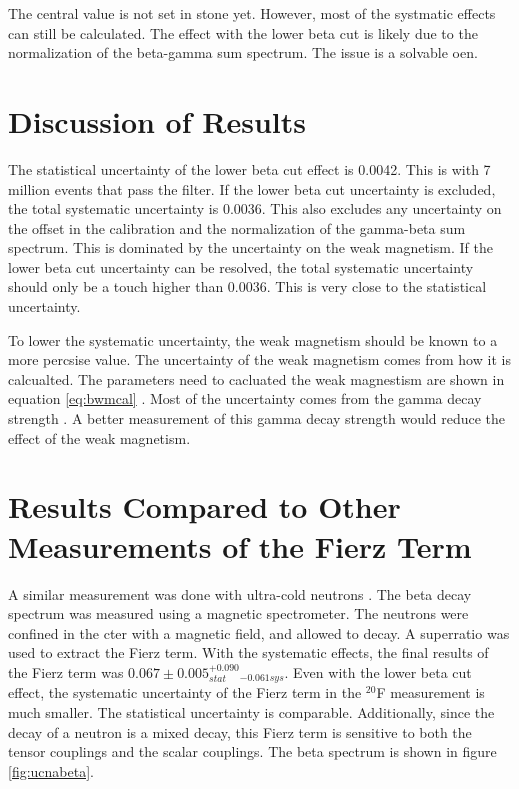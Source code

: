 \documentclass[main.tex]{subfiles}
\begin{document}
The central value is not set in stone yet.
However, most of the systmatic effects can still be calculated.
The effect with the lower beta cut is likely due to the normalization of the beta-gamma sum spectrum.
The issue is a solvable oen. 

\section{Discussion of Results}

The statistical uncertainty of the lower beta cut effect is 0.0042.
This is with 7 million events that pass the filter.
If the lower beta cut uncertainty is excluded, the total systematic uncertainty is 0.0036.
This also excludes any uncertainty on the offset in the calibration and the normalization of the gamma-beta sum spectrum.
This is dominated by the uncertainty on the weak magnetism.
If the lower beta cut uncertainty can be resolved, the total systematic uncertainty should only be a touch higher than 0.0036.
This is very close to the statistical uncertainty. 

To lower the systematic uncertainty, the weak magnetism should be known to a more percsise value.
The uncertainty of the weak magnetism comes from how it is calcualted.
The parameters need to cacluated the weak magnestism are shown in equation \ref{eq:bwmcal} .
Most of the uncertainty comes from the gamma decay strength \cite{Min11}.
A better measurement of this gamma decay strength would reduce the effect of the weak magnetism.

\section{Results Compared to Other Measurements of the Fierz Term}

A similar measurement was done with ultra-cold neutrons \cite{Hic17}.
The beta decay spectrum was measured using a magnetic spectrometer.
The neutrons were confined in the cter with a magnetic field, and allowed to decay.
A superratio was used to extract the Fierz term.
With the systematic effects, the final results of the Fierz term was $0.067 \pm 0.005_{stat} ^{+0.090}_{-0.061 sys}$.
Even with the lower beta cut effect, the systematic uncertainty of the Fierz term in the $^{20}$F measurement is much smaller.
The statistical uncertainty is comparable. 
Additionally, since the decay of a neutron is a mixed decay, this Fierz term is sensitive to both the tensor couplings and the scalar couplings.  
The beta spectrum is shown in figure \ref{fig:ucnabeta}.
\end{document}
